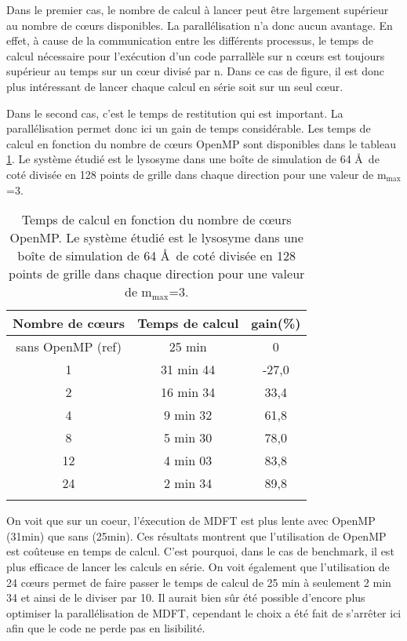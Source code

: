 Dans le premier cas, le nombre de calcul à lancer peut être largement supérieur au nombre de cœurs disponibles. La parallélisation n'a donc aucun avantage. En effet, à cause de la communication entre les différents processus, le temps de calcul nécessaire pour l’exécution d'un code parrallèle sur n cœurs est toujours supérieur au temps sur un cœur divisé par n. Dans ce cas de figure, il est donc plus intéressant de lancer chaque calcul en série soit sur un seul cœur.

Dans le second cas, c'est le temps de restitution qui est important. La parallélisation permet donc ici un gain de temps considérable. Les temps de calcul en fonction du nombre de cœurs OpenMP sont disponibles dans le tableau \ref{tab:perf_openmp}. Le système étudié est le lysosyme dans une boîte de simulation de 64 \AA\ de coté divisée en 128 points de grille dans chaque direction pour une valeur de $\mathrm{m}_\mathrm{max}$=3.



\begin{table}[ht]
 \centering
  \begin{tabular}{c | c | c}
      Nombre de cœurs & Temps de calcul & gain(\%)\\
    \hline
    sans OpenMP (ref) & 25 min & 0\\
     1 & 31 min 44 & -27,0 \\
     2 & 16 min 34 &  33,4 \\
     4 &  9 min 32 &  61,8 \\
     8 &  5 min 30 &  78,0 \\
    12 &  4 min 03 &  83,8 \\
    24 &  2 min 34 &  89,8 \\
    \hline \multicolumn{3}{c}{} \\[-1em]\hline
  \end{tabular}
  \caption[Temps de calcul en fonction du nombre de cœurs OpenMP.]{Temps de calcul en fonction du nombre de cœurs OpenMP. Le système étudié est le lysosyme dans une boîte de simulation de 64 \AA\ de coté divisée en 128 points de grille dans chaque direction pour une valeur de $\mathrm{m}_\mathrm{max}$=3.}
  \label{tab:perf_openmp}  
\end{table}


On voit que sur un coeur, l'éxecution de MDFT est plus lente avec OpenMP (31min) que sans (25min). Ces résultats montrent que l'utilisation de OpenMP est co\^uteuse en temps de calcul. C'est pourquoi, dans le cas de benchmark, il est plus efficace de lancer les calculs en série. On voit également que l'utilisation de 24 cœurs permet de faire passer le temps de calcul de 25 min à seulement 2 min 34 et ainsi de le diviser par 10. Il aurait bien sûr été possible d'encore plus optimiser la parallélisation de MDFT, cependant le choix a été fait de s’arrêter ici afin que le code ne perde pas en lisibilité.



